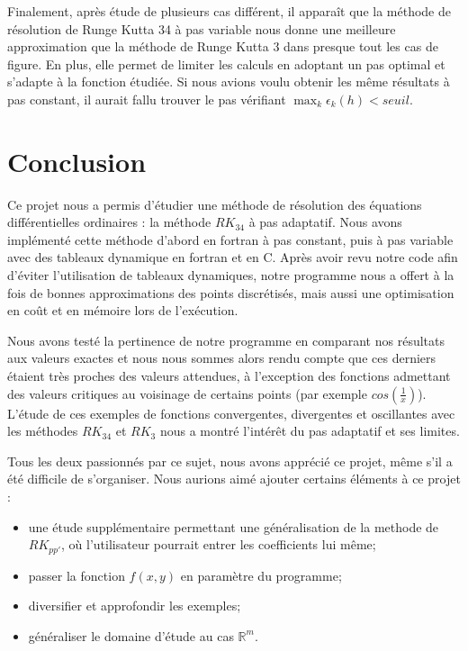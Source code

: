 \documentclass[a4paper, titlepage]{livret} %
\begin{document}
			Finalement, après étude de plusieurs cas différent, il apparaît que la méthode de résolution de Runge Kutta 34 à pas variable nous donne une meilleure approximation que la méthode de Runge Kutta 3 dans presque tout les cas de figure.
			En plus, elle permet de limiter les calculs en adoptant un pas optimal et s'adapte à la fonction étudiée.
			Si nous avions voulu obtenir les même résultats à pas constant, il aurait fallu trouver le pas vérifiant $\max_{k} \epsilon_{k}(h) < seuil$.

	\chapter*{Conclusion}
		Ce projet nous a permis d'étudier une méthode de résolution des équations différentielles ordinaires : la méthode $RK_{34}$ à pas adaptatif. 
		Nous avons implémenté cette méthode d'abord en fortran à pas constant, puis à pas variable avec des tableaux dynamique en fortran et en C.
		Après avoir revu notre code afin d'éviter l'utilisation de tableaux dynamiques, notre programme nous a offert à la fois de bonnes approximations des points discrétisés, mais aussi une optimisation en coût et en mémoire lors de l’exécution. 

		Nous avons testé la pertinence de notre programme en comparant nos résultats aux valeurs exactes et nous nous sommes alors rendu compte que ces derniers étaient très proches des valeurs attendues, à l'exception des fonctions admettant des valeurs critiques au voisinage de certains points (par exemple $cos\left(\frac{1}{x}\right)$).
		L'étude de ces exemples de fonctions convergentes, divergentes et oscillantes avec les méthodes $RK_{34}$ et $RK_{3}$ nous a montré l'intérêt du pas adaptatif et ses limites. 

		Tous les deux passionnés par ce sujet, nous avons apprécié ce projet, même s'il a été difficile de s'organiser.
		Nous aurions aimé ajouter certains éléments à ce projet :
		\begin{itemize}
			\item une étude supplémentaire permettant une généralisation de la methode de $RK_{pp'}$, où l'utilisateur pourrait entrer les coefficients lui même;
			\item passer la fonction $f(x,y)$ en paramètre du programme;
			\item diversifier et approfondir les exemples;
			\item généraliser le domaine d'étude au cas $\mathbb{R}^m$.
		\end{itemize}
\end{document}
